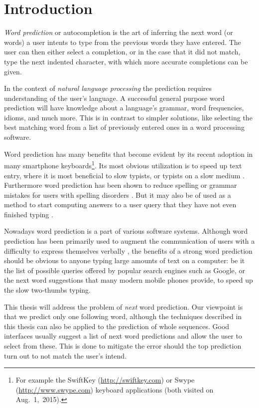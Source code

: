 \chapter{Introduction}
\label{ch:introduction}

\emph{Word prediction} or autocompletion is the art of inferring the next
word (or words) a user intents to type from the previous words they have
entered.
The user can then either select a completion, or in the case that it did not
match, type the next indented character, with which more accurate completions
can be given.

In the context of \emph{natural language processing} the prediction requires
understanding of the user's language.
A successful general purpose word prediction will have knowledge about a
language's grammar, word frequencies, idioms, and much more.
This is in contrast to simpler solutions, like selecting the best matching word
from a list of previously entered ones in a word processing software.

Word prediction has many benefits that become evident by its recent adoption
in many smartphone keyboards\footnote{For example the SwiftKey
(\url{http://swiftkey.com}) or Swype (\url{http://www.swype.com}) keyboard
applications (both visited on Aug.~1,~2015).}.
Its most obvious utilization is to speed up text entry, where it is most
beneficial to slow typists, or typists on a slow medium \parencite{Trnka2007}.
Furthermore word prediction has been shown to reduce spelling or grammar
mistakes for users with spelling disorders \parencite{Newell1992}.
But it may also be of used as a method to start computing answers to a user
query that they have not even finished typing \noref.

Nowadays word prediction is a part of various software systems.
Although word prediction has been primarily used to augment the communication of
users with a difficulty to express themselves verbally
\parencite{Swiffin1987,Trnka2011}, the benefits of a strong word prediction
should be obvious to anyone typing large amounts of text on a computer:
be it the list of possible queries offered by popular search engines such as
Google, or the next word suggestions that many modern mobile phones provide, to
speed up the slow two-thumbs typing.

This thesis will address the problem of \emph{next} word prediction.
Our viewpoint is that we predict only one following word, although the
techniques described in this thesis can also be applied to the prediction
of whole sequences.
Good interfaces usually suggest a list of next word predictions and allow the
user to select from these.
This is done to mitigate the error should the top prediction turn out to not
match the user's intend.

